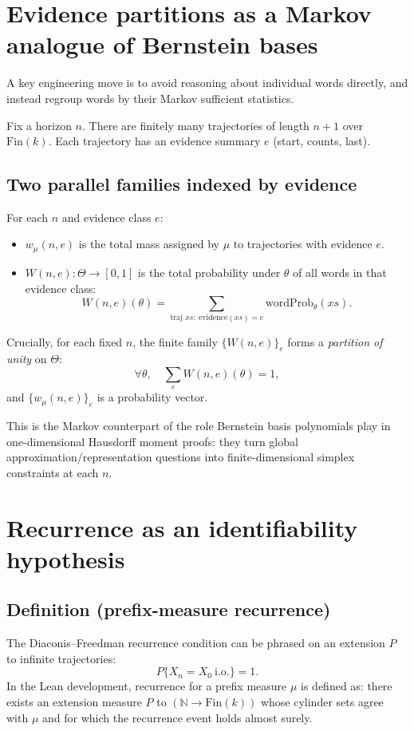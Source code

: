 \documentclass[11pt]{article}
\newcommand{\Fin}{\mathrm{Fin}}
\newcommand{\NN}{\mathbb{N}}
\newcommand{\1}{\mathbf{1}}
\begin{document}
\section{Evidence partitions as a Markov analogue of Bernstein bases}

A key engineering move is to avoid reasoning about individual words directly, and instead regroup words by their Markov sufficient statistics.

Fix a horizon $n$.
There are finitely many trajectories of length $n+1$ over $\Fin(k)$.
Each trajectory has an evidence summary $e$ (start, counts, last).

\subsection{Two parallel families indexed by evidence}

For each $n$ and evidence class $e$:
\begin{itemize}[leftmargin=2em]
\item $w_\mu(n,e)$ is the total mass assigned by $\mu$ to trajectories with evidence $e$.
\item $W(n,e):\Theta\to[0,1]$ is the total probability under $\theta$ of all words in that evidence class:
\[
W(n,e)(\theta)=\sum_{\text{traj } xs:\ \mathrm{evidence}(xs)=e}\mathrm{wordProb}_\theta(xs).
\]
\end{itemize}

Crucially, for each fixed $n$, the finite family $\{W(n,e)\}_e$ forms a \emph{partition of unity} on $\Theta$:
\[
\forall\theta,\quad \sum_e W(n,e)(\theta)=1,
\]
and $\{w_\mu(n,e)\}_e$ is a probability vector.

This is the Markov counterpart of the role Bernstein basis polynomials play in one-dimensional Hausdorff moment proofs: they turn global approximation/representation questions into finite-dimensional simplex constraints at each $n$.

\section{Recurrence as an identifiability hypothesis}

\subsection{Definition (prefix-measure recurrence)}

The Diaconis--Freedman recurrence condition can be phrased on an extension $P$ to infinite trajectories:
\[
P\{ X_n = X_0\ \text{i.o.}\}=1.
\]
In the Lean development, recurrence for a prefix measure $\mu$ is defined as: there exists an extension measure $P$ to $(\NN\to \Fin(k))$ whose cylinder sets agree with $\mu$ and for which the recurrence event holds almost surely.
\end{document}
